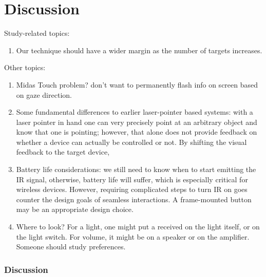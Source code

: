 \section{Discussion}

Study-related topics:
\begin{enumerate}
\item Our technique should have a wider margin as the number of targets increases.

\end{enumerate}

Other topics:
\begin{enumerate}
\item Midas Touch problem? don't want to permanently flash info on screen based on gaze direction.
\item Some fundamental differences to earlier laser-pointer based systems: with a laser pointer in hand one can very precisely point at an arbitrary object and know that one is pointing; however, that alone does not provide feedback on whether a device can actually be controlled or not. By shifting the visual feedback to the target device, 

\item Battery life considerations: we still need to know when to start emitting the IR signal, otherwise, battery life will suffer, which is especially critical for wireless devices. However, requiring complicated steps to turn IR on goes counter the design goals of seamless interactions. A frame-mounted button may be an appropriate design choice.

\item Where to look? For a light, one might put a received on the light itself, or on the light switch. For volume, it might be on a speaker or on the amplifier. Someone should study preferences.
\end{enumerate}

\subsubsection{Discussion}

